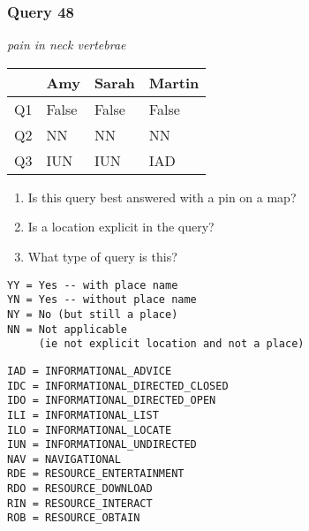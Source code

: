 \begin{frame}[fragile]
\frametitle{Query 48}
\vspace{1em}

\emph{pain in neck vertebrae}

\vfill

\begin{table}
  \centering
  \begin{tabular}{ l l l l }
    & \textbf{Amy} & \textbf{Sarah} & \textbf{Martin}\\
    \toprule
    Q1 & False & False & False\\
Q2 & NN & NN & NN\\
Q3 & IUN & IUN & IAD\\
    \bottomrule
  \end{tabular}
\end{table}

\vfill

\tiny{

\begin{enumerate}
\item Is this query best answered with a pin on a map?
\item Is a location explicit in the query?
\item What type of query is this?
\end{enumerate}

\vfill

\begin{multicols}{2}
\begin{verbatim}
YY = Yes -- with place name
YN = Yes -- without place name
NY = No (but still a place)
NN = Not applicable 
     (ie not explicit location and not a place)
\end{verbatim}

\columnbreak
\begin{verbatim}
IAD = INFORMATIONAL_ADVICE
IDC = INFORMATIONAL_DIRECTED_CLOSED
IDO = INFORMATIONAL_DIRECTED_OPEN
ILI = INFORMATIONAL_LIST
ILO = INFORMATIONAL_LOCATE
IUN = INFORMATIONAL_UNDIRECTED
NAV = NAVIGATIONAL
RDE = RESOURCE_ENTERTAINMENT
RDO = RESOURCE_DOWNLOAD
RIN = RESOURCE_INTERACT
ROB = RESOURCE_OBTAIN
\end{verbatim}
\end{multicols}
}

\end{frame}
